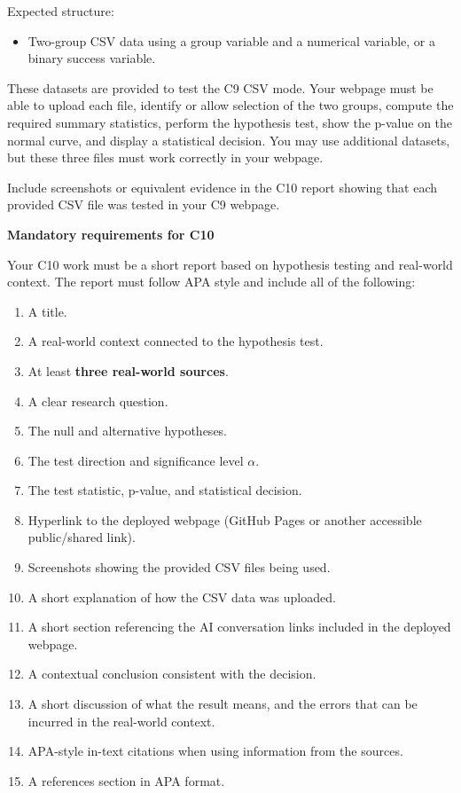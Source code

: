 \documentclass[12pt]{article}
\newcommand{\SubsectionBox}[1]{%
	\noindent\colorbox{gray!30}{%
		\parbox{\linewidth}{\textbf{#1}}%
	}\par\vspace{0.35cm}%
}
\begin{document}
	Expected structure:
	\begin{itemize}
		\item Two-group CSV data using a group variable and a numerical variable, or a binary success variable.
	\end{itemize}
	
	These datasets are provided to test the C9 CSV mode. Your webpage must be able to upload each file, identify or allow selection of the two groups, compute the required summary statistics, perform the hypothesis test, show the p-value on the normal curve, and display a statistical decision. You may use additional datasets, but these three files must work correctly in your webpage.
	
	Include screenshots or equivalent evidence in the C10 report showing that each provided CSV file was tested in your C9 webpage.
	
	\SubsectionBox{Mandatory requirements for C10}
	Your C10 work must be a short report based on hypothesis testing and real-world context. The report must follow APA style and include all of the following:
	\begin{enumerate}
		\item A title.
		\item A real-world context connected to the hypothesis test.
		\item At least \textbf{three real-world sources}.
		\item A clear research question.
		\item The null and alternative hypotheses.
		\item The test direction and significance level \(\alpha\).
		\item The test statistic, p-value, and statistical decision.
		\item Hyperlink to the deployed webpage (GitHub Pages or another accessible public/shared link).
		\item Screenshots showing the provided CSV files being used.
		\item A short explanation of how the CSV data was uploaded.
		\item A short section referencing the AI conversation links included in the deployed webpage.
		\item A contextual conclusion consistent with the decision.
		\item A short discussion of what the result means, and the errors that can be incurred in the real-world context.
		\item APA-style in-text citations when using information from the sources.
		\item A references section in APA format.
	\end{enumerate}
	
\end{document}
